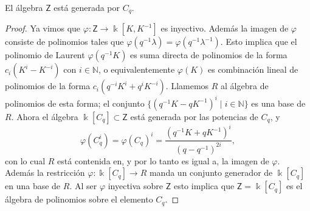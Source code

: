 \documentclass[11pt,fleqn]{article}
\newcommand\NN{\mathbb N}
\renewcommand\k{\Bbbk}
\newcommand\Z{\mathsf Z}
\renewcommand\to{\longrightarrow}
\renewcommand\phi{\varphi}
\begin{document}
\begin{Proposition}
\label{centro-U}
El álgebra $\Z$ está generada por $C_q$. 
\end{Proposition}
\begin{proof}
Ya vimos que $\phi: \Z \to \k[K, K^{-1}]$ es inyectivo. Además la imagen de $\phi$ 
consiste de polinomios tales que $\phi(q^{-1}\lambda) = \phi(q^{-1}\lambda^{-1})$.
Esto implica que el polinomio de Laurent $\phi(q^{-1}K)$ es suma directa de polinomios
de la forma $c_i(K^i - K^{-i})$ con $i \in \NN$, o equivalentemente $\phi(K)$ es 
combinación lineal de polinomios de la forma $c_i(q^{-i} K^i + q^iK^{-i})$. Llamemos
$R$ al álgebra de polinomios de esta forma; el conjunto $\{(q^{-1}K - qK^{-1})^i \mid 
i \in \NN\}$ es una base de $R$. Ahora el álgebra $\k[C_q] \subset \Z$ está generada por 
las potencias de $C_q$, y 
\[
	\phi(C_q^i) = \phi(C_q)^i = \frac{(q^{-1}K + qK^{-1})^i}{(q-q^{-1})^{2i}},
\]
con lo cual $R$ está contenida en, y por lo tanto es igual a, la imagen de $\phi$. 
Además la restricción $\phi: \k[C_q] \to R$ manda un conjunto generador de $\k[C_q]$ en 
una base de $R$. Al ser $\phi$ inyectiva sobre $\Z$ esto implica que $\Z = \k[C_q]$
es el álgebra de polinomios sobre el elemento $C_q$.
\end{proof}



\newpage
\begin{bibdiv}
\begin{biblist}



\end{biblist}
\end{bibdiv}
\end{document}
